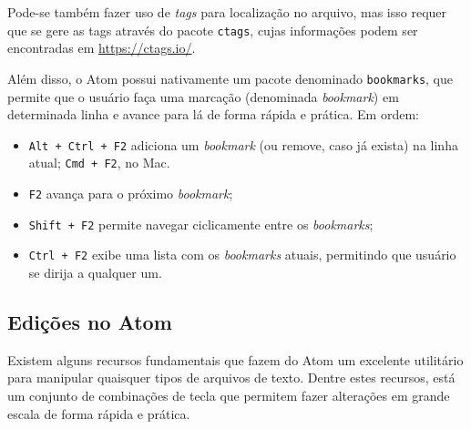 	Pode-se também fazer uso de \textit{tags} para localização no arquivo, mas isso requer que se gere as tags através do pacote \verb|ctags|, cujas informações podem ser encontradas em \href{https://ctags.io/}{https://ctags.io/}.

	Além disso, o Atom possui nativamente um pacote denominado \verb|bookmarks|, que permite que o usuário faça uma marcação (denominada \textit{bookmark}) em determinada linha e avance para lá de forma rápida e prática. Em ordem:
	\begin{itemize}
		\item \verb|Alt + Ctrl + F2| adiciona um \textit{bookmark} (ou remove, caso já exista) na linha atual;
		\subitem \verb|Cmd + F2|, no Mac.
		\item \verb|F2| avança para o próximo \textit{bookmark};
		\item \verb|Shift + F2| permite navegar ciclicamente entre os \textit{bookmarks};
		\item \verb|Ctrl + F2| exibe uma lista com os \textit{bookmarks} atuais, permitindo que usuário se dirija a qualquer um.
	\end{itemize}

	\subsection{Edições no Atom}
	Existem alguns recursos fundamentais que fazem do Atom um excelente utilitário para manipular quaisquer tipos de arquivos de texto. Dentre estes recursos, está um conjunto de combinações de tecla que permitem fazer alterações em grande escala de forma rápida e prática.

